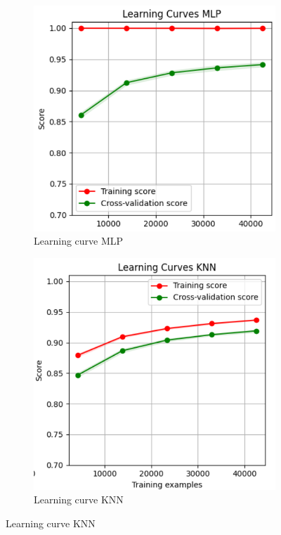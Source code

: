 \documentclass[letterpaper,11pt]{article}
\begin{document}
\begin{figure}[htb]
    \centering
    \begin{subfigure}[b]{0.45\textwidth}
        \centering
        \includegraphics[width=\textwidth]{Images/LearningCurve.png}
        \caption{Learning curve MLP}
        \label{fig:LearningCurve}
    \end{subfigure}
    \hfill
    \begin{subfigure}[b]{0.45\textwidth}
        \centering
        \includegraphics[width=\textwidth]{Images/LearningCurveKNN.PNG}
        \caption{Learning curve KNN}
        \label{fig:LearningCurveKNN}
    \end{subfigure}
\end{figure}
\end{document}
